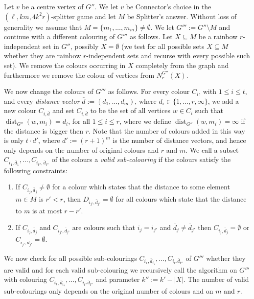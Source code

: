 \documentclass[11pt]{article}
\numberwithin{equation}{section}
\newcommand{\dist}{\operatorname{dist}}
\begin{document}
  Let $v$ be a centre vertex of $G''$. We let $v$ be Connector's choice
  in the $(\ell, km, 4k^2r)$-splitter game and let $M$ be Splitter's
  answer. Without loss of generality we assume that 
  $M=\{m_1,\ldots, m_m\}\neq \emptyset$. We let $G''':=G''\setminus M$ and continue with
  a different colouring of $G'''$ as follows. Let $X\subseteq M$ be a
  rainbow $r$-independent set in $G''$, possibly $X=\emptyset$ (we
  test for all possible sets $X\subseteq M$ whether they are rainbow
  $r$-independent sets and recurse with every possible such set).  We
  remove the colours occurring in $X$ completely from the graph and
  furthermore we remove the colour of vertices from $N_r^{G''}(X)$. 

  We now change the colours of $G'''$ as follows. For every colour
  $C_i$, with $1\leq i \leq t$, and every \emph{distance vector} $\bar{d} := (d_1,\ldots,
  d_m)$, where $d_i\in\{1,\ldots, r, \infty\}$, we add a new colour
  $C_{i,\bar{d}}$ and set $C_{i, \bar{d}}$ to be the set of all vertices
  $w\in C_i$ such that
  $\dist_{G''}(w,m_i) = d_i$, for all $1\leq i\leq r$, where we define
  $\dist_{G''}(w,m_i) = \infty$ if the distance is bigger then $r$.
  Note that the number of colours added in this way is only $t\cdot
  d'$, where $d' := (r+1)^m$ is the number of distance vectors,
  and hence only depends on the number of original colours and $r$ and
  $m$.
  We call a
  subset $C_{i_1, \bar{d}_{1}},\ldots, C_{i_{t''}, \bar{d}_{{t''}}}$ of the colours a \emph{valid
  sub-colouring} if the colours satisfy the
  following constraints:
  \begin{enumerate}
  \item If $C_{i_j, \bar{d}_j}\neq \emptyset$ for a colour which states that
    the distance to some element $m \in M$ is $r'<r$, then
    $D_{i_{j'}, \bar{d}_{j'}}=\emptyset$ for all colours which state that the
    distance to $m$ is at most $r-r'$.
  \item If $C_{i_j, \bar{d}_j}$ and
    $C_{i_{j'}, \bar{d}_{j'}}$ are colours such that $i_j = i_{j'}$
    and $\bar d_j\neq\bar d_{j'}$ then $C_{i_j, \bar{d}_j}=\emptyset$ or
    $C_{i_{j'}, \bar{d}_{j'}}=\emptyset$.
  \end{enumerate}

  We now check for all possible sub-colourings $C_{i_1,
    \bar{d}_{i_1}},\ldots, C_{i_{t''}\bar{d}_{t''}}$ of $G'''$ whether
  they are valid and for each valid sub-colouring we recursively call
  the algorithm on $G'''$ with 
  colouring $C_{i_1, \bar{d}_{i_1}},\ldots, C_{i_{t''}\bar{d}_{t''}}$
  and parameter $k'':=k'-|X|$.
 The number of valid
  sub-colourings only depends on the original number of colours and on
  $m$ and $r$.
\end{document}
